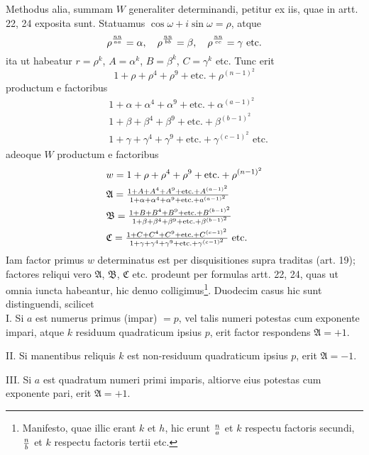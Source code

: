 \documentclass[twoside,12pt, showframe]{memoir}
\let\oldfrac\frac
\def\frac#1#2{\mathchoice{\tfrac{#1}{#2}}{\oldfrac{#1}{#2}}{\genfrac{}{}{}{2}{#1}{#2\mathstrut}}{\genfrac{}{}{}{3}{#1}{#2\mathstrut}}}
\begin{document}
Methodus alia, summam \(W\) generaliter determinandi, petitur ex iis, quae in artt. 22, 24 exposita sunt. Statuamus \(\cos \omega+i \sin \omega=\rho\), atque
\[\rho^{\frac{n n}{a a}}=\alpha, \quad \rho^{\frac{n n}{b b}}=\beta, \quad \rho^{\frac{n n}{c c}}=\gamma \text{ etc.}\]
ita ut habeatur \(r=\rho^{k}\), \(A=\alpha^{k}\), \(B=\beta^{k}\), \(C=\gamma^{k}\) etc. Tunc erit
\[1+\rho+\rho^{4}+\rho^{9}+\text{etc.}+\rho^{(n-1)^{2}}\]
productum e factoribus
\[\begin{aligned}
& 1+\alpha+\alpha^{4}+\alpha^{9}+\text{etc.}+\alpha^{(a-1)^{2}} \\
& 1+\beta+\beta^{4}+\beta^{9}+\text{etc.}+\beta^{(b-1)^{2}} \\
& 1+\gamma+\gamma^{4}+\gamma^{9}+\text{etc.}+\gamma^{(c-1)^{2}} \text{ etc.}
\end{aligned}\]\clearpage\noindent%
adeoque \(W\) productum e factoribus
\[\begin{aligned}
& w=1+\rho+\rho^{4}+\rho^{9}+\text{etc.}+\rho^{(n-1)^{2}} \\
& \mathfrak{A}=\frac{1+A+A^{4}+A^{9}+\text{etc.}+A^{(a-1)^{2}}}{1+\alpha+\alpha^{4}+\alpha^{9}+\text{etc.}+a^{(a-1)^{2}}} \\
& \mathfrak{B}=\frac{1+B+B^{4}+B^{9}+\text{etc.}+B^{(b-1)^{2}}}{1+\beta+\beta^{4}+\beta^{9}+\text{etc.}+\beta^{(b-1)^2}} \\
& \mathfrak{C}=\frac{1+C+C^{4}+C^{9}+\text{etc.}+C^{(c-1)^{2}}}{1+\gamma+\gamma^{4}+\gamma^{9}+\text{etc.}+\gamma^{(c-1)^{2}}} \text{ etc.}
\end{aligned}\]
Iam factor primus \(w\) determinatus est per disquisitiones supra traditas (art. 19); factores reliqui vero \(\mathfrak{A}\), \(\mathfrak{B}\), \(\mathfrak{C}\) etc. prodeunt per formulas artt. 22, 24, quas ut omnia iuncta habeantur, hic denuo colligimus\footnote{Manifesto, quae illic erant \(k\) et \(h\), hic erunt \(\frac{n}{a}\) et \(k\) respectu factoris secundi, \(\frac{n}{b}\) et \(k\) respectu factoris tertii etc.}. Duodecim casus hic sunt distinguendi, scilicet\\
 
I. Si \(a\) est numerus primus (impar) \(=p\), vel talis numeri potestas cum exponente impari, atque \(k\) residuum quadraticum ipsius \(p\), erit factor respondens \(\mathfrak{A}=+1\).
 
II. Si manentibus reliquis \(k\) est non-residuum quadraticum ipsius \(p\), erit \(\mathfrak{A}=-1\).
 
III. Si \(a\) est quadratum numeri primi imparis, altiorve eius potestas cum exponente pari, erit \(\mathfrak{A}=+1\).
\end{document}
